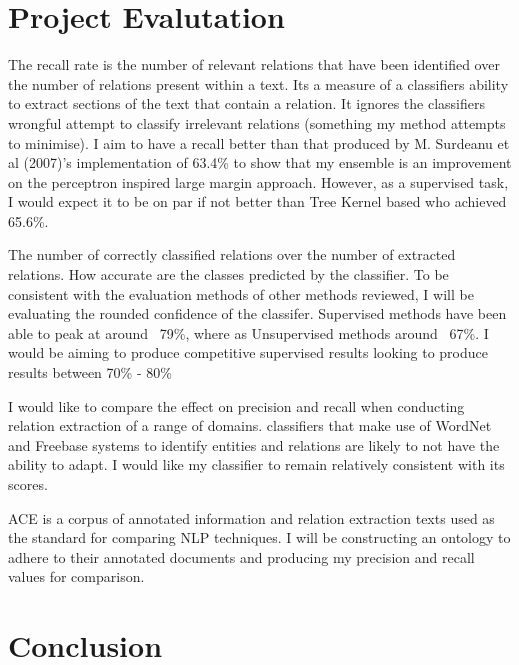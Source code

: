 \documentclass{ecmm427_assignment}
\begin{document}
\section{Project Evalutation}

\begin{description}[style=sameline,leftmargin=2cm]
\item[Recall] The recall rate is the number of relevant relations that have been identified over the number of relations present within a text. Its a measure of a classifiers ability to extract sections of the text that contain a relation. It ignores the classifiers wrongful attempt to classify irrelevant relations (something my method attempts to minimise). I aim to have a recall better than that produced by M. Surdeanu et al (2007)'s implementation of 63.4\% to show that my ensemble is an improvement on the perceptron inspired large margin approach. However, as a supervised task, I would expect it to be on par if not better than Tree Kernel based who achieved 65.6\%. \cite{treeKernel}

\item[Precision] The number of correctly classified relations over the number of extracted relations. How accurate are the classes predicted by the classifier. To be consistent with the evaluation methods of other methods reviewed, I will be evaluating the rounded confidence of the classifer. Supervised methods have been able to peak at around ~79\%, where as Unsupervised methods around ~67\%. I would be aiming to produce competitive supervised results looking to produce results between 70\% - 80\%

\item[Hospitable] I would like to compare the effect on precision and recall when conducting relation extraction of a range of domains. classifiers that make use of WordNet and Freebase systems to identify entities and relations are likely to not have the ability to adapt. I would like my classifier to remain relatively consistent with its scores. 

\item[ACE] ACE is a corpus of annotated information and relation extraction texts used as the standard for comparing NLP techniques. I will be constructing an ontology to adhere to their annotated documents and producing my precision and recall values for comparison.\cite{ACE}\cite{freebaseKnowledge}
\end{description}

\section{Conclusion}
\end{document}
